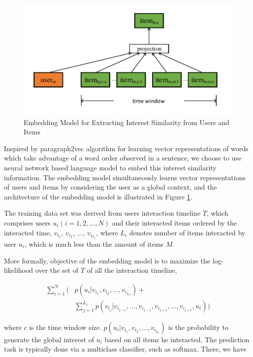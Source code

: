 \documentclass{sig-alternate-05-2015}
\begin{document}
\begin{figure}[htbp]
	\centering
	\includegraphics[scale=0.55]{images/doc2vec.pdf}
	\caption{Embedding Model for Extracting Interest Similarity from Users and Items}
	\label{fig:doc2vec}
\end{figure}

Inspired by paragraph2vec algorithm \cite{le2014distributed} for learning
vector representations of words which take advantage of
a word order observed in a sentence,
we choose to use neural network based language model
to embed this interest similarity information.
The embedding model simultaneously learns vector representations of users and items
by considering the user as a global context,
and the architecture of the embedding model is illustrated in Figure \ref{fig:doc2vec}.

The training data set was derived from users interaction timeline $T$,
which comprises users $u_i (i=1,2,...,N)$ and their interacted items ordered by the interacted time,
$v_{i_1}$, $v_{i_2}$, ..., $v_{i_{L_i}}$,
where $L_i$ denotes number of items interacted by user $u_i$,
which is much less than the amount of items $M$.

More formally, objective of the embedding model is to
maximize the log-likelihood over the set of $T$ of all the interaction timeline,

\begin{equation}
\begin{aligned}
	\sum_{i=1}^{N} \bigg( &p(u_i | v_{i_1}, v_{i_2}, ..., v_{i_{L_n}}) + \\
	                      &\sum_{j=1}^{L_i} p(v_{i_j} | v_{i_{j-c}}, ..., v_{i_{j-1}}, v_{i_{j+1}},..., v_{i_{j+c}}, u_i) \bigg)
\end{aligned}
\end{equation}

where $c$ is the time window size.
$p(u_i | v_{i_1}, v_{i_2}, ..., v_{i_{L_i}})$ is the probability to generate
the global interest of $u_i$ based on all items he interacted.
The prediction task is typically done via a multiclass classifier,
such as softmax. There, we have
\end{document}
